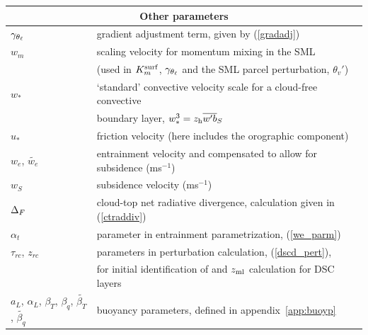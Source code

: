 \documentclass{UMDP_article}
\begin{document}
\begin{flushleft}
  \begin{tabular}{|l|l|}
    \hline
    \multicolumn{2}{|c|}{Other parameters} \\
    \hline
    $\gamma_{\theta_{\ell}}$ & gradient adjustment term, given by (\ref{gradadj}) \\
    $w_m$ & scaling velocity for momentum mixing in the SML \\
    & (used in $K_m^{\rm surf}$, $\gamma_{\theta_{\ell}}$ 
    and the SML parcel perturbation, $\theta_v'$) \\
    $w_*$ & `standard' convective velocity scale for a cloud-free convective \\
    &  boundary layer, $ w_*^3 = z_{\rm h} \overline{w'b}_S $ \\
    $u_*$ & friction velocity (here includes the orographic component) \\
    $w_e$, $\tilde{w_e}$ & entrainment velocity and compensated to allow for 
    subsidence (ms$^{-1}$) \\
    $w_S$ & subsidence velocity (ms$^{-1}$) \\ 
    $\Delta_F $ & cloud-top net radiative divergence, calculation given in
    (\ref{ctraddiv}) \\
    $\alpha_t$ & parameter in entrainment parametrization, (\ref{we_parm}) \\
    $\tau_{rc}$, $z_{rc}$ & parameters in perturbation calculation,
    (\ref{dscd_pert}), \\ 
    & for initial identification of and $z_{\rm ml}$ calculation for DSC layers \\ 
    $a_L$, $\alpha_L$, $\beta_T$, $\beta_q$, $\tilde{\beta_T}$, $\tilde{\beta_q}$
    &  buoyancy parameters, defined in appendix~\ref{app:buoyp} \\
    \hline
  \end{tabular}
\end{flushleft}

\newpage



\end{document}
